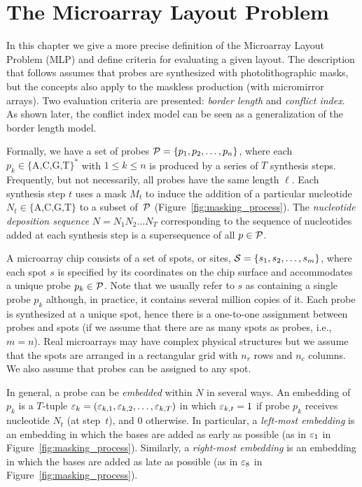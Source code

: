 \chapter{The Microarray Layout Problem}
\label{ch:mlp}

In this chapter we give a more precise definition of the Microarray Layout
Problem (MLP) and define criteria for evaluating a given layout. The description
that follows assumes that probes are synthesized with photolithographic masks,
but the concepts also apply to the maskless production (with micromirror
arrays). Two evaluation criteria are presented: \emph{border length} and
\emph{conflict index}. As shown later, the conflict index model can be seen as a
generalization of the border length model.

Formally, we have a set of probes ${\mathcal{P}} = \{p_{1}, p_{2}, \dots, p_{n}\}$,
where each $p_k \in \{\text{A,C,G,T}\}^\ast$ with $1 \leq k \leq n$ is produced
by a series of $T$
synthesis steps. Frequently, but not necessarily, all probes have the same
length $\ell$. Each synthesis step $t$ uses a mask $M_t$ to induce the addition
of a particular nucleotide $N_t \in \{\text{A,C,G,T}\}$ to a subset of~${\mathcal{P}}$
(Figure~\ref{fig:masking_process}). The \emph{nucleotide deposition sequence}
$N = N_{1} N_{2} \ldots N_{T}$ corresponding to the sequence of nucleotides
added at each synthesis step is a supersequence of all $p \in {\mathcal{P}}$.

A microarray chip consists of a set of spots, or sites,
${\mathcal{S}} = \{s_{1}, s_{2}, \dots, s_{m}\}$, where each spot $s$ is specified by
its coordinates on the chip surface and accommodates a unique probe
$p_k \in {\mathcal{P}}$. Note that we usually refer to $s$ as containing a single probe
$p_k$ although, in practice, it contains several million copies of it. Each
probe is synthesized at a unique spot, hence there is a one-to-one assignment
between probes and spots (if we assume that there are as many spots as probes,
i.e., $m=n$). Real microarrays may have complex physical structures but
we assume that the spots are arranged in a rectangular grid with
$n_r$ rows and $n_c$ columns. We also assume that probes can be assigned to any
spot.

In general, a probe can be \emph{embedded} within $N$ in several ways. An
embedding of $p_{k}$ is a $T$-tuple
$\varepsilon_{k} = (\varepsilon_{k,1}, \varepsilon_{k,2}, \dots, \varepsilon_{k,T})$ in which
$\varepsilon_{k,t} = 1$ if probe $p_{k}$ receives nucleotide $N_{t}$ (at step~$t$), and
0 otherwise. In particular, a \emph{left-most embedding} is an embedding in
which the bases are added as early as possible (as in $\varepsilon_1$ in
Figure~\ref{fig:masking_process}). Similarly, a \emph{right-most embedding} is
an embedding in which the bases are added as late as possible (as in $\varepsilon_8$ in
Figure~\ref{fig:masking_process}).

